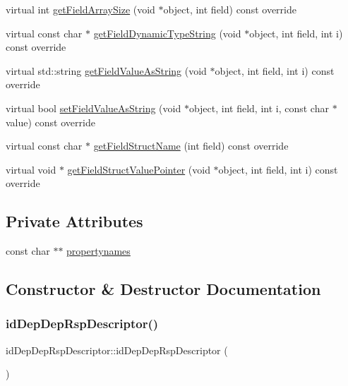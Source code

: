 \begin{DoxyCompactItemize}
virtual int \hyperlink{classidDepDepRspDescriptor_ac8e4e19a337c5833273ca1da6488a05d}{get\+Field\+Array\+Size} (void $\ast$object, int field) const override
\item 
virtual const char $\ast$ \hyperlink{classidDepDepRspDescriptor_a21fe7bc28bb91b7f5d8ce9d84ba1c755}{get\+Field\+Dynamic\+Type\+String} (void $\ast$object, int field, int i) const override
\item 
virtual std\+::string \hyperlink{classidDepDepRspDescriptor_a3f78b6586d3e0239bf8a530398d6db8c}{get\+Field\+Value\+As\+String} (void $\ast$object, int field, int i) const override
\item 
virtual bool \hyperlink{classidDepDepRspDescriptor_a03ed926bf151d7c66ac1e6c659013664}{set\+Field\+Value\+As\+String} (void $\ast$object, int field, int i, const char $\ast$value) const override
\item 
virtual const char $\ast$ \hyperlink{classidDepDepRspDescriptor_ae19bb4da10ef518d7708e9022cc82cca}{get\+Field\+Struct\+Name} (int field) const override
\item 
virtual void $\ast$ \hyperlink{classidDepDepRspDescriptor_a93338cef2d20630f79cf1f93a081016b}{get\+Field\+Struct\+Value\+Pointer} (void $\ast$object, int field, int i) const override
\end{DoxyCompactItemize}
\subsection*{Private Attributes}
\begin{DoxyCompactItemize}
\item 
const char $\ast$$\ast$ \hyperlink{classidDepDepRspDescriptor_ab0e20b196152a98a783f887a12b06ff9}{propertynames}
\end{DoxyCompactItemize}


\subsection{Constructor \& Destructor Documentation}
\mbox{\label{classidDepDepRspDescriptor_a3e2274676a0c9a331848c609c9896ecf}} 
\subsubsection{\texorpdfstring{id\+Dep\+Dep\+Rsp\+Descriptor()}{idDepDepRspDescriptor()}}
{\footnotesize\ttfamily id\+Dep\+Dep\+Rsp\+Descriptor\+::id\+Dep\+Dep\+Rsp\+Descriptor (\begin{DoxyParamCaption}{ }\end{DoxyParamCaption})}

